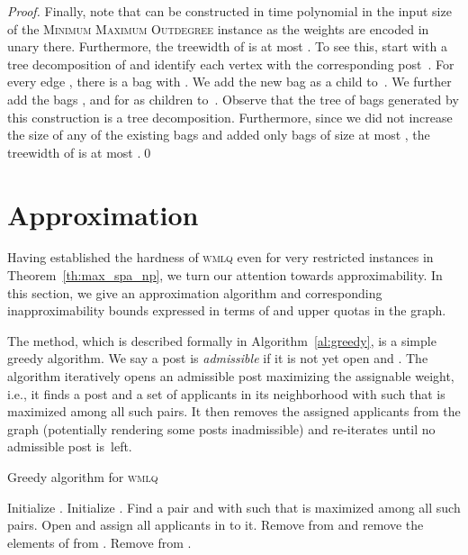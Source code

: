 \documentclass{llncs}
\begin{document}
\begin{proof}
  Finally, note that  can be constructed in time polynomial in the input size of the \textsc{Minimum Maximum Outdegree} instance as the weights are encoded in unary there. Furthermore, the treewidth of  is at most . To see this, start with a tree decomposition of  and identify each vertex  with the corresponding post~. For every edge , there is a bag  with . We add the new bag  as a child to~. We further add the bags ,  and  for  as children to~. Observe that the tree of bags generated by this construction is a tree decomposition. Furthermore, since we did not increase the size of any of the existing bags and added only bags of size at most , the treewidth of  is at most .\qed
\end{proof}

\section{Approximation}
\label{se:approx}
Having established the hardness of \textsc{wmlq} even for very restricted instances in Theorem~\ref{th:max_spa_np}, we turn our attention towards approximability. In this section, we give an approximation algorithm and corresponding inapproximability bounds expressed in terms of  and upper quotas in the graph.

The method, which is described formally in Algorithm~\ref{al:greedy}, is a simple greedy algorithm. We say a post  is \emph{admissible} if it is not yet open and . The algorithm iteratively opens an admissible post maximizing the assignable weight, i.e., it finds a post  and a set  of applicants in its neighborhood  with  such that  is maximized among all such  pairs. It then removes the assigned applicants from the graph (potentially rendering some posts inadmissible) and re-iterates until no admissible post is~left.

\begin{algorithm}[h]
\caption{Greedy algorithm for \textsc{wmlq}}
\label{al:greedy}
\begin{algorithmic}
\State Initialize .
\State Initialize .
\While{}
    \State Find a pair  and  with  such that  is maximized among all such pairs. 
    \State Open  and assign all applicants in  to it.
    \State Remove  from  and remove the elements of  from .
    	\State Remove  from .
    \EndFor
\EndWhile
\end{algorithmic}
\end{algorithm}
\end{document}
